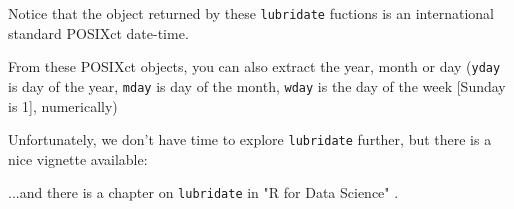 \documentclass[titlepage]{book}\usepackage{knitr}
\begin{document}
\begin{knitrout}
\color{fgcolor}\begin{kframe}
\begin{alltt}
\hlstd{(}\hlstd{)}                    
\hlstd{(}\hlstd{)}                  
 \hlkwb{<-} \hlstd{(}\hlstd{)}
\end{alltt}
\end{kframe}
\end{knitrout}
Notice that the object returned by these \texttt{lubridate} fuctions is an international standard POSIXct date-time.

From these POSIXct objects, you can also extract the year, month or day (\texttt{yday} is day of the year, \texttt{mday} is day of the month, \texttt{wday} is the day of the week [Sunday is 1], numerically)  

\begin{knitrout}
\color{fgcolor}\begin{kframe}
\begin{alltt}
\hlstd{(}\hlstd{())}
\hlstd{(}\hlstd{())}
                               
\end{alltt}
\end{kframe}
\end{knitrout}

Unfortunately, we don't have time to explore \texttt{lubridate} further, but there is a nice vignette available:


\begin{knitrout}
\color{fgcolor}\begin{kframe}
\begin{alltt}
\hlstd{(}\hlstd{)}
\end{alltt}
\end{kframe}
\end{knitrout}
...and there is a chapter on \texttt{lubridate} in "R for Data Science" \cite{Wickham2017}.
\end{document}
